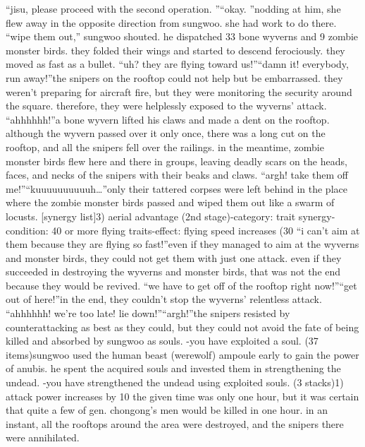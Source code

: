 “jisu, please proceed with the second operation.
”“okay.
”nodding at him, she flew away in the opposite direction from sungwoo.
she had work to do there.
“wipe them out,” sungwoo shouted.
he dispatched 33 bone wyverns and 9 zombie monster birds.
they folded their wings and started to descend ferociously.
 they moved as fast as a bullet.
“uh? they are flying toward us!”“damn it! everybody, run away!”the snipers on the rooftop could not help but be embarrassed.
 they weren’t preparing for aircraft fire, but they were monitoring the security around the square.
therefore, they were helplessly exposed to the wyverns’ attack.
“ahhhhhh!”a bone wyvern lifted his claws and made a dent on the rooftop.
 although the wyvern passed over it only once, there was a long cut on the rooftop, and all the snipers fell over the railings.
in the meantime, zombie monster birds flew here and there in groups, leaving deadly scars on the heads, faces, and necks of the snipers with their beaks and claws.
“argh! take them off me!”“kuuuuuuuuuuh…”only their tattered corpses were left behind in the place where the zombie monster birds passed and wiped them out like a swarm of locusts.
[synergy list]3) aerial advantage (2nd stage)-category: trait synergy-condition: 40 or more flying traits-effect: flying speed increases (30%
“i can’t aim at them because they are flying so fast!”even if they managed to aim at the wyverns and monster birds, they could not get them with just one attack.
 even if they succeeded in destroying the wyverns and monster birds, that was not the end because they would be revived.
“we have to get off of the rooftop right now!”“get out of here!”in the end, they couldn’t stop the wyverns’ relentless attack.
“ahhhhhh! we’re too late! lie down!”“argh!”the snipers resisted by counterattacking as best as they could, but they could not avoid the fate of being killed and absorbed by sungwoo as souls.
-you have exploited a soul.
 (37 items)sungwoo used the human beast (werewolf) ampoule early to gain the power of anubis.
he spent the acquired souls and invested them in strengthening the undead.
-you have strengthened the undead using exploited souls.
 (3 stacks)1) attack power increases by 10%
the given time was only one hour, but it was certain that quite a few of gen.
 chongong’s men would be killed in one hour.
in an instant, all the rooftops around the area were destroyed, and the snipers there were annihilated.


